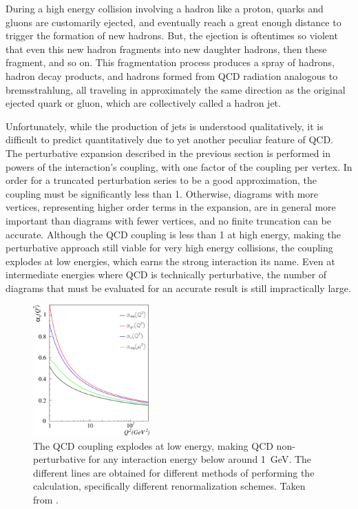   During a high energy collision involving a hadron like a proton, quarks and gluons are customarily ejected, and eventually reach a great enough distance to trigger the formation of new hadrons.
  But, the ejection is oftentimes so violent that even this new hadron fragments into new daughter hadrons, then these fragment, and so on.
  This fragmentation process produces a spray of hadrons, hadron decay products, and hadrons formed from QCD radiation analogous to bremsstrahlung, all traveling in approximately the same direction as the original ejected quark or gluon, which are collectively called a hadron jet.

  Unfortunately, while the production of jets is understood qualitatively, it is difficult to predict quantitatively due to yet another peculiar feature of QCD.
  The perturbative expansion described in the previous section is performed in powers of the interaction's coupling, with one factor of the coupling per vertex.
  In order for a truncated perturbation series to be a good approximation, the coupling must be significantly less than 1.
  Otherwise, diagrams with more vertices, representing higher order terms in the expansion, are in general more important than diagrams with fewer vertices, and no finite truncation can be accurate.
  Although the QCD coupling is less than 1 at high energy, making the perturbative approach still viable for very high energy collisions, the coupling explodes at low energies, which earns the strong interaction its name.
  Even at intermediate energies where QCD is technically perturbative, the number of diagrams that must be evaluated for an accurate result is still impractically large.

  \begin{figure}[h!]
    \centering
    \includegraphics[width=0.4\textwidth]{figures/qcd_coupling.pdf}
    \caption[The QCD coupling as a function of the interaction energy.]{
      The QCD coupling explodes at low energy, making QCD non-perturbative for any interaction energy below around 1~GeV.
      The different lines are obtained for different methods of performing the calculation, specifically different renormalization schemes.
      Taken from \cite{qcd_coupling}.}
    \label{fig:QCDcoupling}
  \end{figure}  

